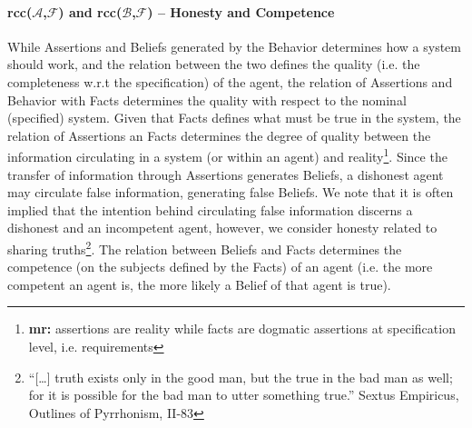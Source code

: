 \documentclass[conference]{IEEEtran}
\newcommand{\fixnote}[2]{\textbf{\color{red}{FIX}}\footnote{{\bf #1:} #2}}
\newcommand{\assertionRegion}{\mathcal{A}}
\newcommand{\beliefRegion}{\mathcal{B}}
\newcommand{\factRegion}{\mathcal{F}}
\newcommand{\Rcc}[2]{rcc(#1,#2)}
\begin{document}
\paragraph{\Rcc{$\assertionRegion$}{$\factRegion$} and
\Rcc{$\beliefRegion$}{$\factRegion$} -- Honesty and Competence} While
Assertions and Beliefs generated by the Behavior determines how a system should
work, and the relation between the two defines the quality (i.e. the
completeness w.r.t the specification) of the agent, the relation of Assertions
and Behavior with Facts determines the quality with respect to the nominal
(specified) system.  Given that Facts defines what must be true in the system,
the relation of Assertions an Facts determines the degree of quality between
the information circulating in a system (or within an agent) and
reality\fixnote{mr}{assertions are reality while facts are dogmatic assertions
at specification level, i.e. requirements}.  Since the transfer of information
through Assertions generates Beliefs, a dishonest agent may circulate false
information, generating false Beliefs.  We note that it is often implied that
the intention behind circulating false information discerns a dishonest and an
incompetent agent, however, we consider honesty related to sharing
truths\footnote{``[\ldots] truth exists only in the good man, but the true in
the bad man as well; for it is possible for the bad man to utter something
true.'' Sextus Empiricus, Outlines of Pyrrhonism,
II-83\autocite{Empiricus1990Pyrrhonism}}.  The relation between Beliefs and
Facts determines the competence (on the subjects defined by the Facts) of an
agent (i.e. the more competent an agent is, the more likely a Belief of that
agent is true).
\end{document}
